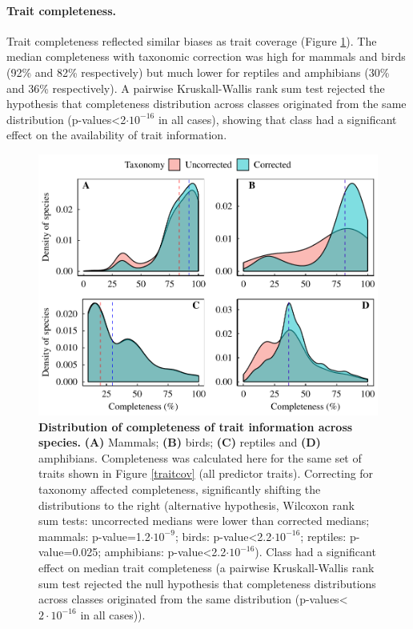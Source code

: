 \paragraph{Trait completeness.}
 Trait completeness reflected similar biases as trait coverage (Figure \ref{traitcomp}). The median completeness with taxonomic correction was high for mammals and birds (92\% and 82\% respectively) but much lower for reptiles and amphibians (30\% and 36\% respectively). A pairwise Kruskall-Wallis rank sum test rejected the hypothesis that completeness distribution across classes originated from the same distribution (p-values<2$\cdot10^{-16}$ in all cases), showing that class had a significant effect on the availability of trait information. 

\begin{figure}[h]
\centering
\includegraphics[scale=0.70]{figures/chapter2/Trait_coverage/Missing_values/Traitcompleteness}
\caption[Distribution of completeness of trait information across species]{\textbf{Distribution of completeness of trait information across species.} \textbf{(A)} Mammals; \textbf{(B)} birds; \textbf{(C)} reptiles and \textbf{(D)} amphibians. Completeness was calculated here for the same set of traits shown in Figure \ref{traitcov} (all predictor traits). Correcting for taxonomy affected completeness, significantly shifting the distributions to the right (alternative hypothesis, Wilcoxon rank sum tests: uncorrected medians were lower than corrected medians; mammals: p-value=1.2$\cdot10^{-9}$; birds: p-value<2.2$\cdot10^{-16}$; reptiles: p-value=0.025; amphibians: p-value<2.2$\cdot10^{-16}$). Class had a significant effect on median trait completeness (a pairwise Kruskall-Wallis rank sum test rejected the null hypothesis that completeness distributions across classes originated from the same distribution (p-values<$2\cdot10^{-16}$ in all cases)).}
\label{traitcomp}
\end{figure}


